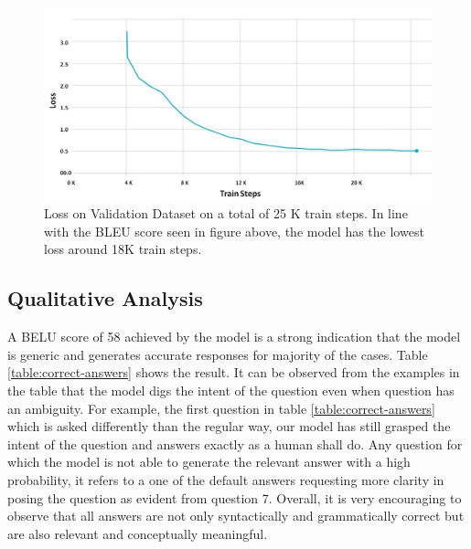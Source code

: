\documentclass[conference]{IEEEtran}
\begin{document}
\begin{figure}[h!]
  \centering
    \includegraphics[width=\linewidth]{loss.png}
  \caption{Loss on Validation Dataset on a total of 25 K train steps. In line with the BLEU score seen in figure above, the model has the lowest loss around 18K train steps.}
  \label{fig:loss}
\end{figure}


\subsection{Qualitative Analysis}

A BELU score of 58 achieved by the model is a strong indication that the model is generic and generates accurate responses for majority of the cases. Table \ref{table:correct-answers} shows the result. It can be observed from the examples in the table that the model digs the intent of the question even when question has an ambiguity. For example, the first question in table \ref{table:correct-answers} which is asked differently than the regular way, our model has still grasped the intent of the question and answers exactly as a human shall do. Any question for which the model is not able to generate the relevant answer with a high probability, it refers to a one of the default answers requesting more clarity in posing the question as evident from question 7. Overall, it is very encouraging to observe that all answers are not only syntactically and  grammatically correct but are also relevant and conceptually meaningful.   
\end{document}

